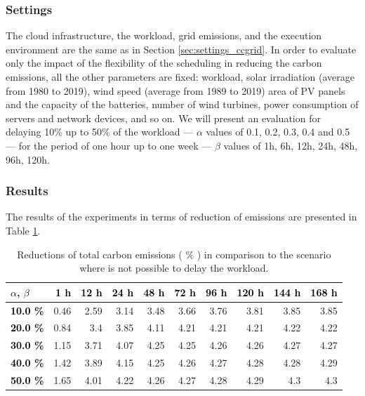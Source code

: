 \subsubsection{Settings}

The cloud infrastructure, the workload, grid emissions, and the execution environment are the same as in Section  \ref{sec:settings_ccgrid}. In order to evaluate only the impact of the flexibility of the scheduling in reducing the carbon emissions, all the other parameters are fixed: workload, solar irradiation (average from 1980 to 2019), wind speed (average from 1989 to 2019) area of PV panels and the capacity of the batteries, number of wind turbines, power consumption of servers and network devices, and so on. We will present an evaluation for delaying 10\% up to 50\% of the workload --- $\alpha$ values of 0.1, 0.2, 0.3, 0.4 and 0.5 --- for the period of one hour up to one week --- $\beta$ values of 1h, 6h, 12h, 24h, 48h, 96h, 120h.

\subsubsection{Results}

The results of the experiments in terms of reduction of  emissions are presented in Table \ref{tab:flex_scheduling}.

\begin{table}[h]
  \caption{Reductions of total carbon emissions ( \% ) in comparison to the scenario where is not possible to delay the workload.}\centering
       \label{tab:flex_scheduling}
\begin{tabular}{|l|r|r|r|r|r|r|r|r|r|}
\hline
\textcolor{black} {$\alpha$}, \textcolor{black}{$\beta$} &   \textcolor{black}{\textbf{ 1 h }} &  \textcolor{black}{\textbf{ 12 h }} &  \textcolor{black}{\textbf{ 24 h }} &  \textcolor{black}{\textbf{ 48 h }}  &   \textcolor{black}{\textbf{ 72 h}} &   \textcolor{black}{\textbf{ 96 h}} &   \textcolor{black}{\textbf{ 120 h }} &   \textcolor{black}{\textbf{ 144 h}} &   \textcolor{black}{\textbf{ 168 h}} \\ 
     \hline
 \textcolor{black}{ \textbf{10.0 \%}}   &  0.46 &  2.59 &  3.14 &  3.48 &  3.66 &  3.76 &  3.81 &  3.85 &  3.85 \\ 
\hline
 \textcolor{black}{ \textbf{20.0 \%}}   &  0.84 &  3.4 &  3.85 &  4.11 &  4.21 &  4.21 &  4.21 &  4.22 &  4.22 \\ 
\hline
 \textcolor{black}{ \textbf{30.0 \%}}   &  1.15 &  3.71 &  4.07 &  4.25 &  4.25 &  4.26 &  4.26 &  4.27 &  4.27 \\ 
\hline
 \textcolor{black}{ \textbf{40.0 \%}}   &  1.42 &  3.89 &  4.15 &  4.25 &  4.26 &  4.27 &  4.28 &  4.28 &  4.29 \\ 
\hline
 \textcolor{black}{ \textbf{50.0 \%}}   &  1.65 &  4.01 &  4.22 &  4.26 &  4.27 &  4.28 &  4.29 &  4.3 &  4.3 \\ 
\hline
\end{tabular}
\end{table}




